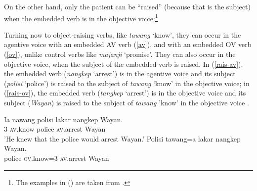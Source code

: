 \documentclass[output=paper
	        ,collection
	        ,collectionchapter
 	        ,biblatex
                ,babelshorthands
                ,newtxmath
                ,draftmode
                ,colorlinks, citecolor=brown
]{langscibook}
\begin{document}
On the other hand, only the patient can be ``raised'' (because that is the subject) when the embedded verb is in the objective voice:\footnote{
The examples in () are taken from .
}

\eal
{}
\zl


Turning now to object-raising verbs, like \emph{tawang} `know',  they can occur in the agentive
voice with an embedded AV verb (\ref{av}), and with an embedded OV verb (\ref{ov}), unlike control
verbs like \emph{majanji} `promise'. 
They can also occur in the objective voice, when the subject of the embedded verb is raised.  In
(\ref{rais-av}), the embedded verb (\emph{nangkep} `arrest') is in the agentive voice and its
subject (\emph{polisi} `police') is raised to the subject of \emph{tawang} `know' in the objective
voice; in (\ref{rais-ov}), the embedded verb (\emph{tangkep} `arrest') is in the objective voice and
its subject (\emph{Wayan}) is raised to the subject of 
\emph{tawang} 'know' in the objective voice \citep[ex 23]{WechslerandArka1998}.

\eal
\ex 
\label{av}
\gll Ia nawang          polisi lakar  nangkep            Wayan. \\
     3 \textsc{av}.know police \FUT{} \textsc{av}.arrest Wayan \\
\glt 'He knew that the police would arrest Wayan.'
\ex
\label{rais-av} 
\gll Polisi tawang=a           lakar  nangkep            Wayan. \\
     police \textsc{ov}.know=3 \FUT{} \textsc{av}.arrest Wayan\\
\end{document}
